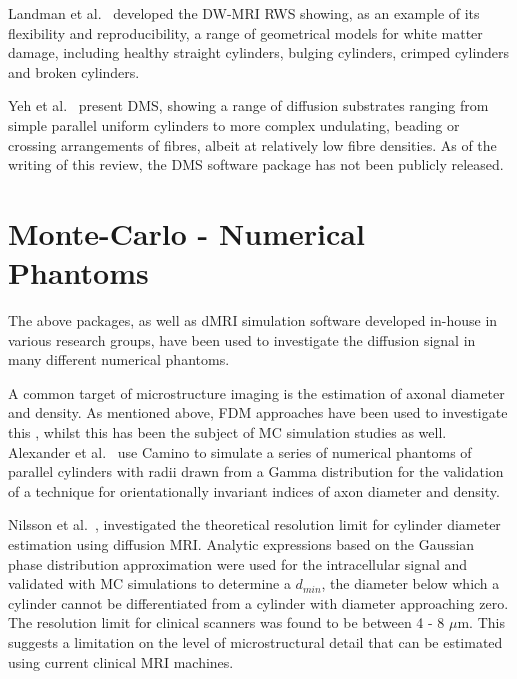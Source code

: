 Landman et al.\ \cite{Landman2010} developed the DW-MRI \ac{RWS} showing, as an example of its flexibility and reproducibility, a range of geometrical models for white matter damage, including healthy straight cylinders, bulging cylinders, crimped cylinders and broken cylinders.

Yeh et al.\ \cite{Yeh2013} present \ac{DMS}, showing a range of diffusion substrates ranging from simple parallel uniform cylinders to more complex undulating, beading or crossing arrangements of fibres, albeit at relatively low fibre densities.
As of the writing of this review, the \ac{DMS} software package has not been publicly released. 

\section{Monte-Carlo - Numerical Phantoms}
\label{sec:app_monte_carlo_numerical_phantoms}
The above packages, as well as \ac{dMRI} simulation software developed in-house in various research groups, have been used to investigate the diffusion signal in many different numerical phantoms. 

A common target of microstructure imaging is the estimation of axonal diameter and density.
As mentioned above, \ac{FDM} approaches have been used to investigate this \cite{Chin2002,Xu2014}, whilst this has been the subject of \ac{MC} simulation studies as well.
Alexander et al.\ \cite{Alexander2010} use Camino to simulate a series of numerical phantoms of parallel cylinders with radii drawn from a Gamma distribution for the validation of a technique for orientationally invariant indices of axon diameter and density.

Nilsson et al.\ \cite{Nilsson2017}, investigated the theoretical resolution limit for cylinder diameter estimation using diffusion MRI. Analytic expressions based on the Gaussian phase distribution approximation \cite{Price1997} were used for the intracellular signal and validated with \ac{MC} simulations to determine a $d_{min}$, the diameter below which a cylinder cannot be differentiated from a cylinder with diameter approaching zero. The resolution limit for clinical scanners was found to be between 4 - 8 $\mu$m.
This suggests a limitation on the level of microstructural detail that can be estimated using current clinical \ac{MRI} machines.


